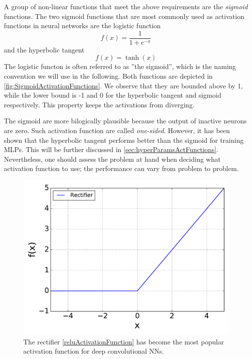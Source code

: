 \documentclass[twoside,english]{uiofysmaster}
\begin{document}
A group of non-linear functions that meet the above requirements are the \textit{sigmoid} functions. 
The two sigmoid functions that are most commonly used as activation functions \cite{Rojas96} in 
neural networks are the logistic function
\begin{equation}
 f(x) = \frac{1}{1 + e^{-x}}
 \label{sigmoidActivationFunction}
\end{equation}
and the hyperbolic tangent
\begin{equation}
 f(x) = \tanh(x)
 \label{tanhActivationFunction}
\end{equation}
The logistic functon is often referred to as ''the sigmoid'', which is the naming convention we will use 
in the following. Both functions are depicted in \autoref{fig:SigmoidActivationFunctions}. We observe that they
are bounded above by 1, while the lower bound is -1 and 0 for the hyperbolic tangent and sigmoid respectively. This property 
keeps the activations from diverging. 

The sigmoid are more bilogically plausible because 
the output of inactive neurons are zero. Such activation function are called \textit{one-sided}. However,
it has been shown \cite{Karlik11} that the hyperbolic tangent 
performs better than the sigmoid for training MLPs. This will be further discussed in \autoref{sec:hyperParamsActFunctions}. 
Nevertheless, one should assess the problem 
at hand when deciding what activation function to use; the performance can vary from problem to problem. 
\begin{figure}
\centering
 \includegraphics[width = 0.7\linewidth]{Figures/Theory/reluActivation.pdf}
  \caption{The rectifier \eqref{reluActivationFunction} has become the most popular activation function for 
           deep convolutional NNs.}
  \label{fig:reluActivationFunction}
\end{figure}
\end{document}
